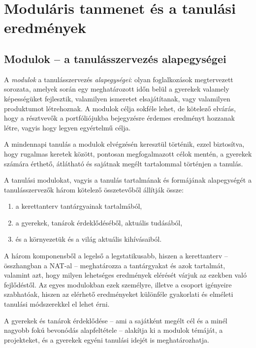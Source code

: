 \section{Moduláris tanmenet és a tanulási eredmények}

\subsection{Modulok -- a tanulásszervezés alapegységei}
\label{sec:modulok}

A \emph{modulok} a tanulásszervezés \emph{alapegységei}: olyan foglalkozások
megtervezett sorozata, amelyek során egy meghatározott időn belül a
gyerekek valamely képességüket fejlesztik, valamilyen ismeretet
elsajátítanak, vagy valamilyen produktumot létrehoznak. A modulok célja
sokféle lehet, de kötelező elvárás, hogy a résztvevők a portfóliójukba
bejegyzésre érdemes eredményt hozzanak létre, vagyis hogy legyen
egyértelmű célja.

A mindennapi tanulás a modulok elvégzésén
keresztül történik, ezzel biztosítva, hogy rugalmas keretek között,
pontosan megfogalmazott célok mentén, a gyerekek számára érthető,
átlátható és sajátnak megélt tartalommal történjen a tanulás.

A tanulási modulokat, vagyis a tanulás tartalmának és formájának
alapegységét a tanulásszervezők három kötelező összetevőből állítják
össze:

\begin{enumerate}
      \item
            a kerettanterv tantárgyainak tartalmából,
      \item
            a gyerekek, tanárok érdeklődéséből, aktuális tudásából,
      \item
            és a környezetük és a világ aktuális kihívásaiból.
\end{enumerate}

A három komponensből a legelső a legstatikusabb, hiszen a kerettanterv --
összhangban a NAT-al --
meghatározza a tantárgyakat és azok tartalmát, valamint azt, hogy milyen
lehetséges eredmények elérését várjuk az ezekben való fejlődéstől. Az
egyes modulokban ezek személyre, illetve a csoport igényeire szabhatóak,
hiszen az elérhető eredményeket különféle gyakorlati és elméleti
tanulási módszerekkel el lehet érni.

A gyerekek és tanárok érdeklődése -- ami a sajátként megélt cél és a
minél nagyobb fokú bevonódás alapfeltétele -- alakítja ki a modulok
témáját, a projekteket, és a gyerekek egyéni tanulási idejét is
meghatározhatja.

